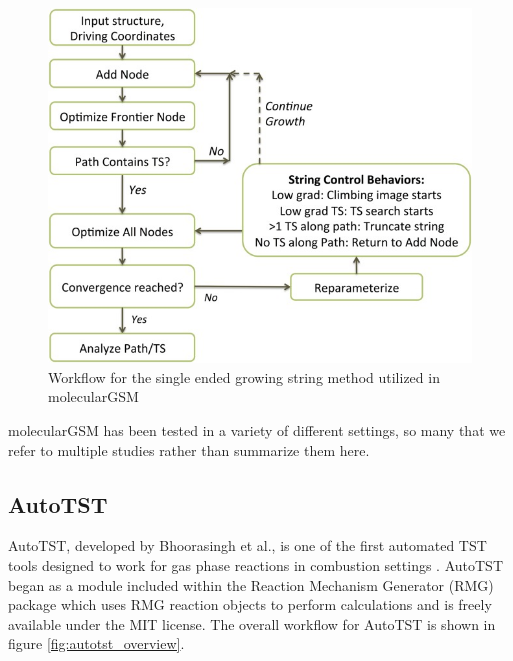 \documentclass[preprint, 11pt]{elsarticle} %
\begin{document}
\begin{figure}
    \centering
    \includegraphics[width=5in]{se-gsm}
    \caption{Workflow for the single ended growing string method utilized in molecularGSM \cite{Zimmerman:2015jcc}}
    \label{fig:se-gsm}
\end{figure}

molecularGSM has been tested in a variety of different settings, so many that we refer to multiple studies \cite{Zimmerman:2013jctc, Zimmerman:2013jcp, Zimmerman:2015jcc, Jafari:2017, Roessler:2018, Aldaz:2018} rather than summarize them here.


\subsection{AutoTST}

AutoTST, developed by Bhoorasingh et al., is one of the first automated TST tools designed to work for gas phase reactions in combustion settings \cite{bhoorasingh:2017}.
AutoTST began as a module included within the Reaction Mechanism Generator (RMG) package which uses RMG reaction objects to perform calculations and is freely available under the MIT license. 
The overall workflow for AutoTST is shown in figure \ref{fig:autotst_overview}.
\end{document}
